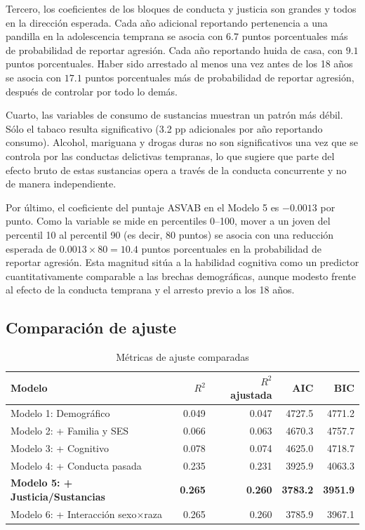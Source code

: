 \documentclass[11pt]{article}
\begin{document}
Tercero, los coeficientes de los bloques de conducta y justicia son grandes y todos en la dirección esperada. Cada año adicional reportando pertenencia a una pandilla en la adolescencia temprana se asocia con $6.7$ puntos porcentuales más de probabilidad de reportar agresión. Cada año reportando huida de casa, con $9.1$ puntos porcentuales. Haber sido arrestado al menos una vez antes de los 18 años se asocia con $17.1$ puntos porcentuales más de probabilidad de reportar agresión, después de controlar por todo lo demás.

Cuarto, las variables de consumo de sustancias muestran un patrón más débil. Sólo el tabaco resulta significativo (3.2 pp adicionales por año reportando consumo). Alcohol, mariguana y drogas duras no son significativos una vez que se controla por las conductas delictivas tempranas, lo que sugiere que parte del efecto bruto de estas sustancias opera a través de la conducta concurrente y no de manera independiente.

Por último, el coeficiente del puntaje ASVAB en el Modelo 5 es $-0.0013$ por punto. Como la variable se mide en percentiles 0--100, mover a un joven del percentil 10 al percentil 90 (es decir, $80$ puntos) se asocia con una reducción esperada de $0.0013 \times 80 = 10.4$ puntos porcentuales en la probabilidad de reportar agresión. Esta magnitud sitúa a la habilidad cognitiva como un predictor cuantitativamente comparable a las brechas demográficas, aunque modesto frente al efecto de la conducta temprana y el arresto previo a los 18 años.

\subsection{Comparación de ajuste}

\begin{table}[H]
\centering
\caption{Métricas de ajuste comparadas}
\label{tab:fit}
\small
\begin{tabular}{lrrrr}
\toprule
Modelo & $R^2$ & $R^2$ ajustada & AIC & BIC \\
\midrule
Modelo 1: Demográfico & 0.049 & 0.047 & 4727.5 & 4771.2 \\
Modelo 2: + Familia y SES & 0.066 & 0.063 & 4670.3 & 4757.7 \\
Modelo 3: + Cognitivo & 0.078 & 0.074 & 4625.0 & 4718.7 \\
Modelo 4: + Conducta pasada & 0.235 & 0.231 & 3925.9 & 4063.3 \\
\textbf{Modelo 5: + Justicia/Sustancias} & \textbf{0.265} & \textbf{0.260} & \textbf{3783.2} & \textbf{3951.9} \\
Modelo 6: + Interacción sexo$\times$raza & 0.265 & 0.260 & 3785.9 & 3967.1 \\
\bottomrule
\end{tabular}
\end{table}
\end{document}
